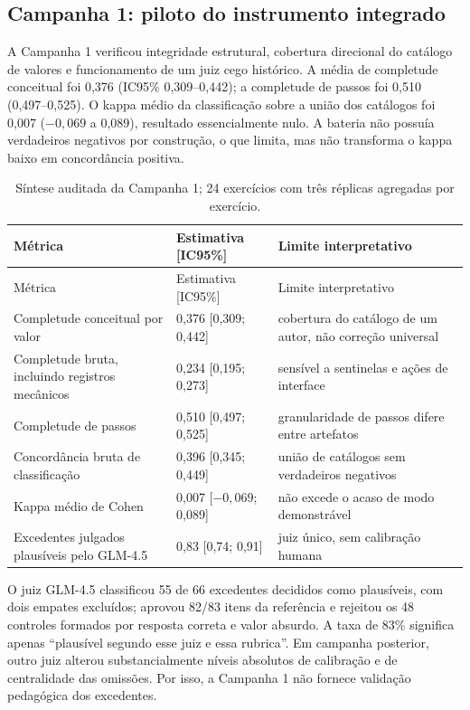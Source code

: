 \documentclass[11pt,a4paper]{article}
\begin{document}
\subsection{Campanha 1: piloto do instrumento integrado}

A Campanha 1 verificou integridade estrutural, cobertura direcional do catálogo de valores e funcionamento de um juiz cego histórico. A média de completude conceitual foi 0,376 (IC95\% 0,309--0,442); a completude de passos foi 0,510 (0,497--0,525). O kappa médio da classificação sobre a união dos catálogos foi 0,007 ($-0,069$ a 0,089), resultado essencialmente nulo. A bateria não possuía verdadeiros negativos por construção, o que limita, mas não transforma o kappa baixo em concordância positiva.

\begingroup
\small
\setlength{\tabcolsep}{3pt}
\begin{longtable}{@{}P{6.6cm}C{3.0cm}P{4.6cm}@{}}
\caption{Síntese auditada da Campanha 1; 24 exercícios com três réplicas agregadas por exercício.}\label{tab:c1}\\
\toprule
Métrica & Estimativa [IC95\%] & Limite interpretativo \\
\midrule
\endfirsthead
\toprule
Métrica & Estimativa [IC95\%] & Limite interpretativo \\
\midrule
\endhead
Completude conceitual por valor & 0,376 [0,309; 0,442] & cobertura do catálogo de um autor, não correção universal \\
Completude bruta, incluindo registros mecânicos & 0,234 [0,195; 0,273] & sensível a sentinelas e ações de interface \\
Completude de passos & 0,510 [0,497; 0,525] & granularidade de passos difere entre artefatos \\
Concordância bruta de classificação & 0,396 [0,345; 0,449] & união de catálogos sem verdadeiros negativos \\
Kappa médio de Cohen & 0,007 [$-0,069$; 0,089] & não excede o acaso de modo demonstrável \\
Excedentes julgados plausíveis pelo GLM-4.5 & 0,83 [0,74; 0,91] & juiz único, sem calibração humana \\
\bottomrule
\end{longtable}
\endgroup

O juiz GLM-4.5 classificou 55 de 66 excedentes decididos como plausíveis, com dois empates excluídos; aprovou 82/83 itens da referência e rejeitou os 48 controles formados por resposta correta e valor absurdo. A taxa de 83\% significa apenas ``plausível segundo esse juiz e essa rubrica''. Em campanha posterior, outro juiz alterou substancialmente níveis absolutos de calibração e de centralidade das omissões. Por isso, a Campanha 1 não fornece validação pedagógica dos excedentes.
\end{document}
